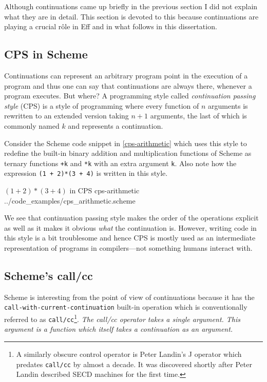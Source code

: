 \documentclass[class=article, crop=false]{standalone}
\begin{document}
Although continuations came up briefly in the previous section I did not
explain what they are in detail. This section is devoted to this because
continuations are playing a crucial rôle in Eff and in what follows in this
dissertation.

\subsection{CPS in Scheme}
\lstset{language=scheme}

Continuations can represent an arbitrary program point in the execution of a
program and thus one can say that continuations are always there, whenever a
program executes. But where? A programming style called \emph{continuation
passing style} (CPS) is a style of programming where every function of $n$
arguments is rewritten to an extended version taking $n+1$ arguments, the last
of which is commonly named $k$ and represents a continuation.

Consider the Scheme code snippet in \autoref{cps-arithmetic} which uses this style to redefine the
built-in binary addition and multiplication functions of Scheme as ternary
functions \lstinline|+k| and \lstinline|*k| with an extra argument \verb|k|.
Also note how the expression \lstinline|(1 + 2)*(3 + 4)| is written in this
style.

{$(1+2) * (3+4)$ in CPS}
{cps-arithmetic}
{../code_examples/cps_arithmetic.scheme}

We see that continuation passing style makes the order of the operations
explicit as well as it makes it obvious \emph{what} the continuation is.
However, writing code in this style is a bit troublesome and hence CPS is mostly
used as an intermediate representation of programs in compilers---not
something humans interact with.

\subsection{Scheme's call/cc}

Scheme is interesting from the point of view of continuations because it has the
\lstinline|call-with-current-continuation| built-in operation which is
conventionally referred to as \lstinline|call/cc|\footnote{A similarly obscure control operator is Peter Landin's J operator
which predates \lstinline{call/cc} by almost a decade. It was discovered shortly
after Peter Landin described SECD machines for the first time.}.
\emph{The call/cc operator takes a single argument. This argument is a \emph{function}
which itself takes a \emph{continuation} as an argument.}
\end{document}
